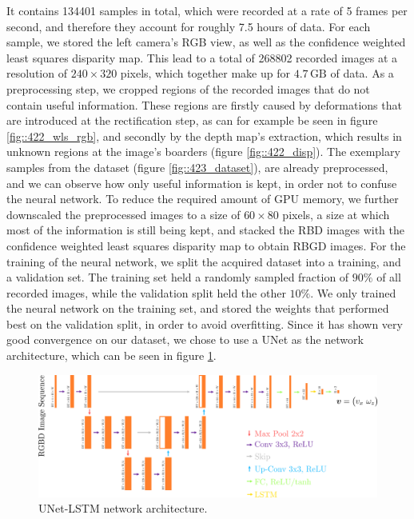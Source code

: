 It contains 134401 samples in total, which were recorded at a rate of 5 frames per second, and therefore they account for roughly 7.5 hours of data. For each sample, we stored the left camera's RGB view, as well as the confidence weighted least squares disparity map. This lead to a total of 268802 recorded images at a resolution of $240\times320$ pixels, which together make up for $4.7\,\text{GB}$ of data. As a preprocessing step, we cropped regions of the recorded images that do not contain useful information. These regions are firstly caused by deformations that are introduced at the rectification step, as can for example be seen in figure \ref{fig::422_wls_rgb}, and secondly by the depth map's extraction, which results in unknown regions at the image's boarders (figure \ref{fig::422_disp}). The exemplary samples from the dataset (figure \ref{fig::423_dataset}), are already preprocessed, and we can observe how only useful information is kept, in order not to confuse the neural network. To reduce the required amount of GPU memory, we further downscaled the preprocessed images to a size of $60\times80$ pixels, a size at which most of the information is still being kept, and stacked the RBD images with the confidence weighted least squares disparity map to obtain RBGD images. For the training of the neural network, we split the acquired dataset into a training, and a validation set. The training set held a randomly sampled fraction of $90\%$ of all recorded images, while the validation split held the other $10\%$. We only trained the neural network on the training set, and stored the weights that performed best on the validation split, in order to avoid overfitting. Since it has shown very good convergence on our dataset, we chose to use a UNet \cite{ronneberger2015u} as the network architecture, which can be seen in figure \ref{fig::423_unet}.
\begin{figure}[h!]
	\centering
	\includegraphics[scale=.5]{chapters/04_experiments/02_autonomous_walking/unet.png}
	\caption{UNet-LSTM network architecture.}
	\label{fig::423_unet}
\end{figure}
